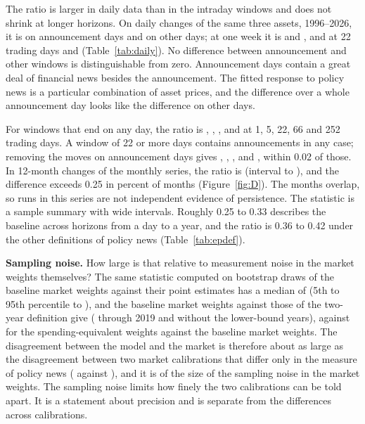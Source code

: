 \documentclass[11pt]{article}
\begin{document}
\begin{appendices}
The ratio is larger in daily data than in the intraday windows and does not shrink at longer horizons. On daily changes of the same three assets, 1996--2026, it is  on announcement days and  on other days; at one week it is  and , and at 22 trading days  and  (Table~\ref{tab:daily}). No difference between announcement and other windows is distinguishable from zero. Announcement days contain a great deal of financial news besides the announcement. The fitted response to policy news is a particular combination of asset prices, and the difference over a whole announcement day looks like the difference on other days.



For windows that end on any day, the ratio is , , ,  and  at 1, 5, 22, 66 and 252 trading days. A window of 22 or more days contains announcements in any case; removing the moves on announcement days gives , , ,  and , within 0.02 of those. In 12-month changes of the monthly series, the ratio is  (interval  to ), and the difference exceeds 0.25 in  percent of months (Figure~\ref{fig:D}). The months overlap, so runs in this series are not independent evidence of persistence. The statistic is a sample summary with wide intervals. Roughly 0.25 to 0.33 describes the baseline across horizons from a day to a year, and the ratio is 0.36 to 0.42 under the other definitions of policy news (Table~\ref{tab:epdef}).

\textbf{Sampling noise.} How large is that relative to measurement noise in the market weights themselves? The same statistic computed on bootstrap draws of the baseline market weights against their point estimates has a median of  (5th to 95th percentile  to ), and the baseline market weights against those of the two-year definition give  ( through 2019 and  without the lower-bound years), against  for the spending-equivalent weights against the baseline market weights. The disagreement between the model and the market is therefore about as large as the disagreement between two market calibrations that differ only in the measure of policy news ( against ), and it is of the size of the sampling noise in the market weights. The sampling noise limits how finely the two calibrations can be told apart. It is a statement about precision and is separate from the differences across calibrations.


\end{appendices}
\end{document}
